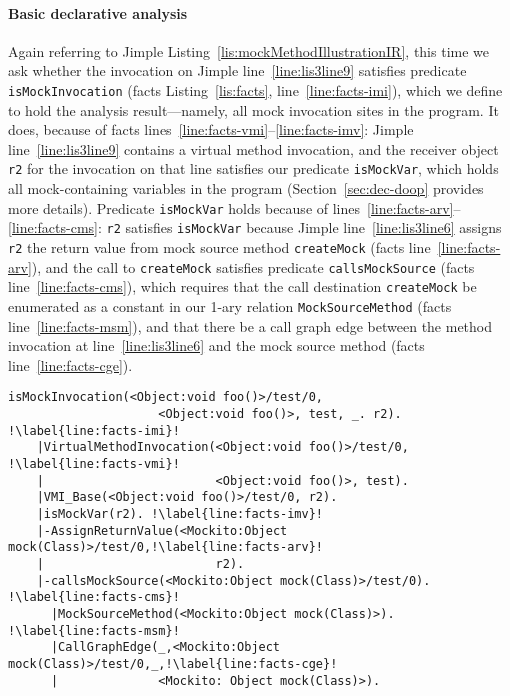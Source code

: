 \paragraph{Basic declarative analysis} Again referring to Jimple Listing~\ref{lis:mockMethodIllustrationIR}, this time we ask whether the invocation on Jimple line~\ref{line:lis3line9} satisfies predicate \texttt{isMockInvocation} (facts Listing~\ref{lis:facts}, line~\ref{line:facts-imi}), which we define to hold the analysis result---namely, all mock invocation sites in the program. It does, because of facts lines~\ref{line:facts-vmi}--\ref{line:facts-imv}: Jimple line~\ref{line:lis3line9} contains a virtual method invocation, and the receiver object \texttt{r2} for the invocation on that line satisfies our predicate \texttt{isMockVar}, which holds all mock-containing variables in the program (Section~\ref{sec:dec-doop} provides more details). Predicate \texttt{isMockVar} holds because of lines~\ref{line:facts-arv}--\ref{line:facts-cms}: \texttt{r2} satisfies \texttt{isMockVar} because Jimple line~\ref{line:lis3line6} assigns \texttt{r2} the return value from mock source method \texttt{createMock} (facts line~\ref{line:facts-arv}), and the call to \texttt{createMock} satisfies predicate \texttt{callsMockSource} (facts line~\ref{line:facts-cms}), which requires that the call destination \texttt{createMock} be enumerated as a constant in our 1-ary relation \texttt{MockSourceMethod} (facts line~\ref{line:facts-msm}), and that there be a call graph edge between the method invocation at line~\ref{line:lis3line6} and the mock source method (facts line~\ref{line:facts-cge}).


\begin{lstlisting}[basicstyle=\ttfamily, caption={Facts about invocation \texttt{r2.foo()} in method \texttt{test}.},
basicstyle=\scriptsize\ttfamily, framesep=4.5mm, framexleftmargin=1.0mm, captionpos=b, label=lis:facts, escapechar=!, morekeywords={@Test}]
	isMockInvocation(<Object:void foo()>/test/0, 
	                 <Object:void foo()>, test, _. r2). !\label{line:facts-imi}!
	|VirtualMethodInvocation(<Object:void foo()>/test/0, !\label{line:facts-vmi}!
	|                        <Object:void foo()>, test).
	|VMI_Base(<Object:void foo()>/test/0, r2).
	|isMockVar(r2). !\label{line:facts-imv}!
	|-AssignReturnValue(<Mockito:Object mock(Class)>/test/0,!\label{line:facts-arv}!
	|                        r2).
	|-callsMockSource(<Mockito:Object mock(Class)>/test/0). !\label{line:facts-cms}!
	  |MockSourceMethod(<Mockito:Object mock(Class)>). !\label{line:facts-msm}!
	  |CallGraphEdge(_,<Mockito:Object mock(Class)>/test/0,_,!\label{line:facts-cge}!
	  |              <Mockito: Object mock(Class)>). 
\end{lstlisting}


